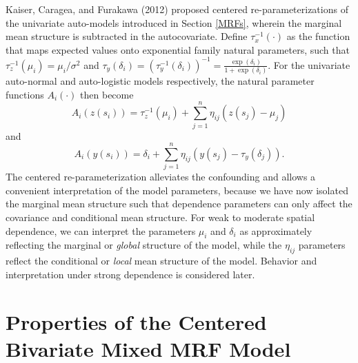 \documentclass[12pt, a4paper, twoside]{article}
\begin{document}
Kaiser, Caragea, and Furakawa (2012) proposed centered re-parameterizations of the univariate auto-models introduced in Section \ref{MRFs}, wherein the marginal mean structure is subtracted in the autocovariate. Define $\tau^{-1}_x(\cdot)$ as the function that maps expected values onto exponential family natural parameters, such that $\tau^{-1}_z(\mu_i)=\mu_i/\sigma^2$ and $\tau_y(\delta_i) = (\tau^{-1}_y(\delta_i))^{-1} = \frac{\exp(\delta_i)}{1+\exp(\delta_i)}$. For the univariate auto-normal and auto-logistic models respectively, the natural parameter functions $A_i(\cdot)$ then become
\begin{equation}\label{centerZ}
A_i(z(s_i)) = \tau^{-1}_z(\mu_i) + \sum_{j=1}^{n}\eta_{ij}\left(z(s_j)-\mu_j\right)
\end{equation} and
\begin{equation} \label{centerY}
A_i(y(s_i)) = \delta_i + \sum_{j=1}^{n}\eta_{ij}\left(y(s_j)-\tau_y(\delta_j)\right) .
\end{equation}
The centered re-parameterization alleviates the confounding and allows a convenient interpretation of the model parameters, because we have now isolated the marginal mean structure such that dependence parameters can only affect the covariance and conditional mean structure. For weak to moderate spatial dependence, we can interpret the parameters $\mu_i$ and $\delta_i$ as approximately reflecting the marginal or \textit{global} structure of the model, while the $\eta_{ij}$ parameters reflect the conditional or \textit{local} mean structure of the model. Behavior and interpretation under strong dependence is considered later.

\section{Properties of the Centered Bivariate Mixed MRF Model} \label{BivMMRF}
\end{document}
